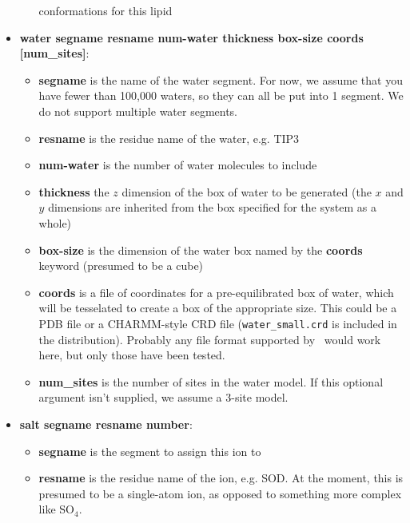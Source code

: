 \documentclass[12pt]{article}
\begin{document}
\begin{itemize}
\begin{itemize}
             conformations for this lipid
          \end{itemize}
    \item {\bf water segname resname num-water thickness box-size coords
[num\_sites]}:
          \begin{itemize}
             \item {\bf segname} is the name of the water segment.  For now,
             we assume that you have fewer than 100,000 waters, so they can
             all be put into 1 segment.  We do not support multiple water
             segments.
             \item {\bf resname} is the residue name of the water, e.g. TIP3
             \item {\bf num-water} is the number of water molecules to
             include
             \item {\bf thickness} the $z$ dimension of the box of water to be
             generated (the $x$ and $y$ dimensions are inherited from the box
             specified for the system as a whole)
             \item {\bf box-size} is the dimension of the water box named by
             the {\bf coords} keyword (presumed to be a cube)
             \item {\bf coords} is a file of coordinates for a
             pre-equilibrated box of water, which will be tesselated to
             create a box of the appropriate size.  This could be a PDB file or
             a CHARMM-style CRD file ({\tt water\_small.crd} is included in the
             distribution).  Probably any file format supported by
             \loos\ would work here, but only those have been tested.
             \item {\bf num\_sites} is the number of sites in the water model.
             If this optional argument isn't supplied, we assume a 3-site model.
          \end{itemize}
     \item {\bf salt segname resname number}:
          \begin{itemize}
            \item {\bf segname} is the segment to assign this ion to
            \item {\bf resname} is the residue name of the ion, e.g. SOD.  At
            the moment, this is presumed to be a single-atom ion, as opposed
            to something more complex like SO$_4$.

\end{itemize}
\end{itemize}
\end{document}
